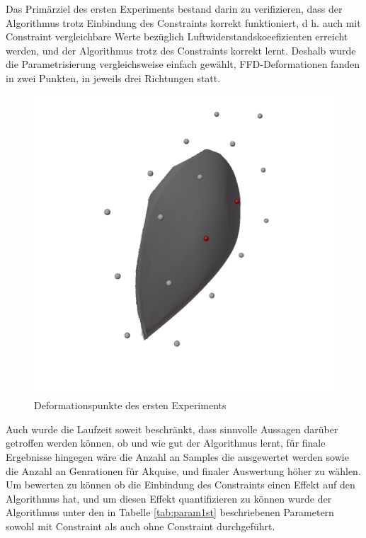 Das Primärziel des ersten Experiments bestand darin zu verifizieren, dass der Algorithmus trotz Einbindung des Constraints korrekt funktioniert, d h. auch mit Constraint vergleichbare Werte bezüglich Luftwiderstandskoeefizienten erreicht werden, und der Algorithmus trotz des Constraints korrekt lernt.
Deshalb wurde die Parametrisierung vergleichsweise einfach gewählt, FFD-Deformationen fanden in zwei Punkten, in jeweils drei Richtungen statt.
\begin{figure}[h]
	\includegraphics[width=.7\linewidth]{bilder/2ptDeformationPoints}
	\caption{Deformationspunkte des ersten Experiments}
	\label{fig:ffd1st}
\end{figure}
Auch wurde die Laufzeit soweit beschränkt, dass sinnvolle Aussagen darüber getroffen werden können, ob und wie gut der Algorithmus lernt, für finale Ergebnisse hingegen wäre die Anzahl an Samples die ausgewertet werden sowie die Anzahl an Genrationen für Akquise, und finaler Auswertung höher zu wählen.
Um bewerten zu können ob die Einbindung des Constraints einen Effekt auf den Algorithmus hat, und um diesen Effekt quantifizieren zu können wurde der Algorithmus unter den in Tabelle \cref{tab:param1st} beschriebenen Parametern sowohl mit Constraint als auch ohne Constraint durchgeführt. 
